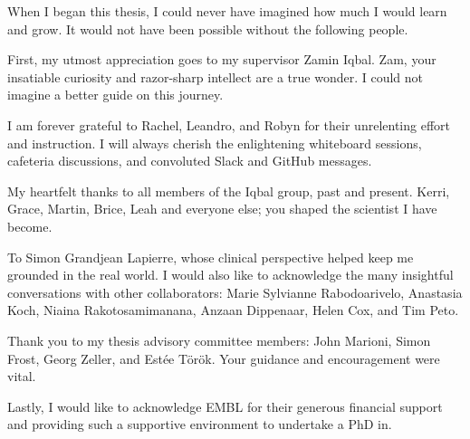 
\begin{acknowledgements}      

When I began this thesis, I could never have imagined how much I would learn and grow. It would not have been possible without the following people.

\noindent
First, my utmost appreciation goes to my supervisor Zamin Iqbal. Zam, your insatiable curiosity and razor-sharp intellect are a true wonder. I could not imagine a better guide on this journey.

\noindent
I am forever grateful to Rachel, Leandro, and Robyn for their unrelenting effort and instruction. I will always cherish the enlightening whiteboard sessions, cafeteria discussions, and convoluted Slack and GitHub messages.  

\noindent
My heartfelt thanks to all members of the Iqbal group, past and present. Kerri, Grace, Martin, Brice, Leah and everyone else; you shaped the scientist I have become.

\noindent
To Simon Grandjean Lapierre, whose clinical perspective helped keep me grounded in the real world. I would also like to acknowledge the many insightful conversations with other collaborators: Marie Sylvianne Rabodoarivelo, Anastasia Koch, Niaina Rakotosamimanana, Anzaan Dippenaar, Helen Cox, and Tim Peto.

\noindent
Thank you to my thesis advisory committee members: John Marioni, Simon Frost, Georg Zeller, and Estée Török. Your guidance and encouragement were vital.

\noindent
Lastly, I would like to acknowledge EMBL for their generous financial support and providing such a supportive environment to undertake a PhD in.

\end{acknowledgements}
